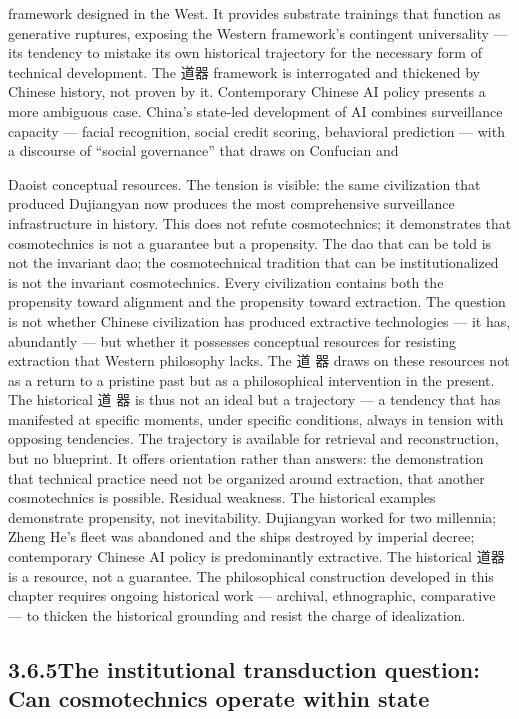 framework designed in the West. It provides substrate trainings that function as generative ruptures, exposing the Western framework’s contingent universality — its tendency to mistake its own historical trajectory for the necessary form of technical development. The 道器 framework is interrogated and thickened by Chinese history, not proven by it. Contemporary Chinese AI policy presents a more ambiguous case. China’s state-led development of AI combines surveillance capacity — facial recognition, social credit scoring, behavioral prediction — with a discourse of “social governance” that draws on Confucian and

Daoist conceptual resources. The tension is visible: the same civilization that produced Dujiangyan now produces the most comprehensive surveillance infrastructure in history. This does not refute cosmotechnics; it demonstrates that cosmotechnics is not a guarantee but a propensity. The dao that can be told is not the invariant dao; the cosmotechnical tradition that can be institutionalized is not the invariant cosmotechnics. Every civilization contains both the propensity toward alignment and the propensity toward extraction. The question is not whether Chinese civilization has produced extractive technologies — it has, abundantly — but whether it possesses conceptual resources for resisting extraction that Western philosophy lacks. The 道 器 draws on these resources not as a return to a pristine past but as a philosophical intervention in the present. The historical 道 器 is thus not an ideal but a trajectory — a tendency that has manifested at specific moments, under specific conditions, always in tension with opposing tendencies. The trajectory is available for retrieval and reconstruction, but no blueprint. It offers orientation rather than answers: the demonstration that technical practice need not be organized around extraction, that another cosmotechnics is possible. Residual weakness. The historical examples demonstrate propensity, not inevitability. Dujiangyan worked for two millennia; Zheng He’s fleet was abandoned and the ships destroyed by imperial decree; contemporary Chinese AI policy is predominantly extractive. The historical 道器 is a resource, not a guarantee. The philosophical construction developed in this chapter requires ongoing historical work — archival, ethnographic, comparative — to thicken the historical grounding and resist the charge of idealization.

\subsection{3.6.5\quad The institutional transduction question: Can cosmotechnics operate within state}

